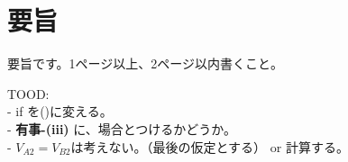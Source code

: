 \documentclass[main.tex]{subfiles}
\begin{document}
\section*{要旨}

要旨です。1ページ以上、2ページ以内書くこと。

TOOD:\\
- if を()に変える。\\
- \textbf{有事-(iii)} に、場合とつけるかどうか。\\
- $V_{A2} = V_{B2}$は考えない。（最後の仮定とする） or 計算する。
\end{document}
